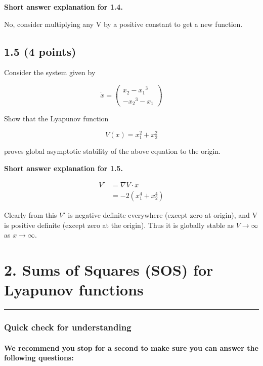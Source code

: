 \documentclass[11pt]{article}
\begin{document}
    \textbf{Short answer explanation for 1.4.}

No, consider multiplying any V by a positive constant to get a new
function.

    \subsection{1.5 (4 points)}\label{points}

Consider the system given by

\begin{equation}
\dot{x}= \left(\begin{array}{c} {x_2} - {{x_1}}^3\\  - {{x_2}}^3 - {x_1} \end{array}\right)\label{p2System}
\end{equation}

Show that the Lyapunov function

\[
V(x) = x_1^2 + x_2^2 
\]

proves global asymptotic stability of the above equation to the origin.

    \textbf{Short answer explanation for 1.5.}

\begin{align}
V' &= \nabla V \cdot \dot{x}\\
&= -2(x_1^4+x_2^4)
\end{align}

Clearly from this \(V'\) is negative definite everywhere (except zero at
origin), and V is positive definite (except zero at the origin). Thus it
is globally stable as \(V \rightarrow \infty\) as
\(x \rightarrow \infty\).

    \section{2. Sums of Squares (SOS) for Lyapunov
functions}\label{sums-of-squares-sos-for-lyapunov-functions}

    \begin{center}\rule{0.5\linewidth}{\linethickness}\end{center}

\subsubsection{Quick check for
understanding}\label{quick-check-for-understanding}

\paragraph{We recommend you stop for a second to make sure you can
answer the following
questions:}\label{we-recommend-you-stop-for-a-second-to-make-sure-you-can-answer-the-following-questions}
\end{document}
